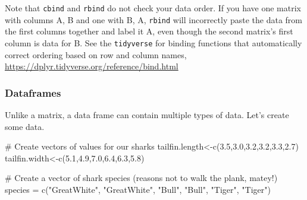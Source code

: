 \documentclass[
  letterpaper,
  DIV=11,
  numbers=noendperiod]{scrartcl}
\newenvironment{Shaded}{\begin{snugshade}}{\end{snugshade}}
\newcommand{\CommentTok}[1]{\textcolor[rgb]{0.37,0.37,0.37}{#1}}
\newcommand{\FloatTok}[1]{\textcolor[rgb]{0.68,0.00,0.00}{#1}}
\newcommand{\FunctionTok}[1]{\textcolor[rgb]{0.28,0.35,0.67}{#1}}
\newcommand{\NormalTok}[1]{\textcolor[rgb]{0.00,0.23,0.31}{#1}}
\newcommand{\OtherTok}[1]{\textcolor[rgb]{0.00,0.23,0.31}{#1}}
\newcommand{\StringTok}[1]{\textcolor[rgb]{0.13,0.47,0.30}{#1}}
\begin{document}
\begin{tcolorbox}[enhanced jigsaw, colbacktitle=quarto-callout-warning-color!10!white, title=\textcolor{quarto-callout-warning-color}{\faExclamationTriangle}\hspace{0.5em}{Beware data order}, breakable, toprule=.15mm, coltitle=black, opacityback=0, bottomtitle=1mm, leftrule=.75mm, colframe=quarto-callout-warning-color-frame, bottomrule=.15mm, toptitle=1mm, arc=.35mm, titlerule=0mm, rightrule=.15mm, left=2mm, opacitybacktitle=0.6, colback=white]

Note that \texttt{cbind} and \texttt{rbind} do not check your data
order. If you have one matrix with columns A, B and one with B, A,
\texttt{rbind} will incorrectly paste the data from the first columns
together and label it A, even though the second matrix's first column is
data for B. See the \texttt{tidyverse} for binding functions that
automatically correct ordering based on row and column names,
\url{https://dplyr.tidyverse.org/reference/bind.html}

\end{tcolorbox}

\subsubsection{Dataframes}\label{dataframes}

Unlike a matrix, a data frame can contain multiple types of data. Let's
create some data.

\begin{Shaded}
\begin{Highlighting}[]
\CommentTok{\# Create vectors of values for our sharks}
\NormalTok{tailfin.length}\OtherTok{\textless{}{-}}\FunctionTok{c}\NormalTok{(}\FloatTok{3.5}\NormalTok{,}\FloatTok{3.0}\NormalTok{,}\FloatTok{3.2}\NormalTok{,}\FloatTok{3.2}\NormalTok{,}\FloatTok{3.3}\NormalTok{,}\FloatTok{2.7}\NormalTok{)}
\NormalTok{tailfin.width}\OtherTok{\textless{}{-}}\FunctionTok{c}\NormalTok{(}\FloatTok{5.1}\NormalTok{,}\FloatTok{4.9}\NormalTok{,}\FloatTok{7.0}\NormalTok{,}\FloatTok{6.4}\NormalTok{,}\FloatTok{6.3}\NormalTok{,}\FloatTok{5.8}\NormalTok{)}

\CommentTok{\# Create a vector of shark species (reasons not to walk the plank, matey!)}
\NormalTok{species }\OtherTok{=} \FunctionTok{c}\NormalTok{(}\StringTok{"GreatWhite"}\NormalTok{,}
            \StringTok{"GreatWhite"}\NormalTok{,}
            \StringTok{"Bull"}\NormalTok{,}
            \StringTok{"Bull"}\NormalTok{,}
            \StringTok{"Tiger"}\NormalTok{,}
            \StringTok{"Tiger"}\NormalTok{)}
\end{Highlighting}
\end{Shaded}
\end{document}
